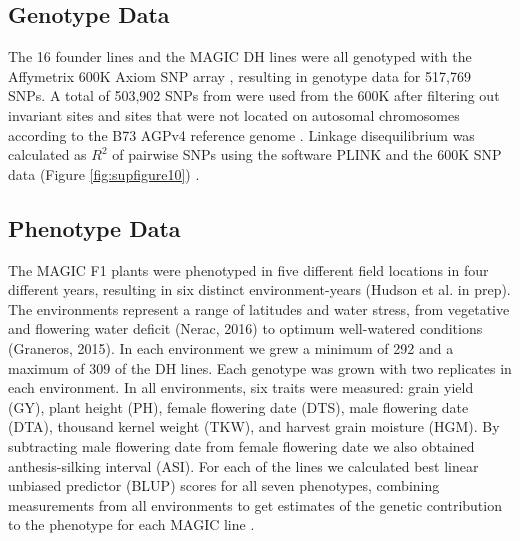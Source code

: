 \documentclass[9pt,twocolumn,twoside]{gsag3jnl}
\begin{document}
\subsection{Genotype Data}
The 16 founder lines and the MAGIC DH lines were all genotyped with the Affymetrix 600K Axiom SNP array \citep{Unterseer}, resulting in genotype data for 517,769 SNPs.
A  total of 503,902 SNPs from were used from the  600K after filtering out invariant sites and sites that were not located on autosomal chromosomes according to the B73 AGPv4 reference genome \citep{Jiao}.
Linkage disequilibrium was calculated as $R^2$ of pairwise SNPs using the software PLINK and the 600K SNP data (Figure \ref{fig:supfigure10}) \citep{Purcell}.

\subsection{Phenotype Data}
The MAGIC F1 plants were phenotyped in five different field locations in four different years, resulting in six distinct environment-years (Hudson et al. in prep).
The environments represent a range of latitudes and water stress, from vegetative and flowering water deficit (Nerac, 2016) to optimum well-watered conditions (Graneros, 2015).
In each environment we grew a minimum of 292 and a maximum of 309 of the DH lines. Each genotype was grown with two replicates in each environment.
In all environments, six traits were measured: grain yield (GY), plant height (PH), female flowering date (DTS), male flowering date (DTA), thousand kernel weight (TKW), and harvest grain moisture (HGM). By subtracting male flowering date from female flowering date we also obtained anthesis-silking interval (ASI).
For each of the lines we calculated best linear unbiased predictor (BLUP) scores for all seven phenotypes, combining measurements from all environments to get estimates of the genetic contribution to the phenotype for each MAGIC line \citep{Aulchenko}.
\end{document}
